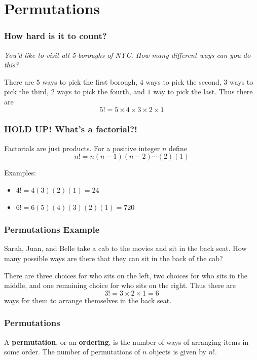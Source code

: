 \documentclass{beamer}
\newcommand{\<}{\langle}
\renewcommand{\>}{\rangle}
\begin{document}
\section{Permutations}


\begin{frame}
\frametitle{How hard is it to count?}

\emph{You'd like to visit all 5 boroughs of NYC. How many different ways can you do this?}
\newline

\pause

There are $5$ ways to pick the first borough, $4$ ways to pick the second, $3$ ways to pick the third, $2$ ways to pick the fourth, and $1$ way to pick the last. Thus there are
\[
5! = 5 \times 4 \times 3 \times 2 \times 1
\]

\end{frame}


\begin{frame}
\frametitle{HOLD UP! What's a factorial?!}

Factorials are just products. For a positive integer $n$ define
\[
n! = n(n-1)(n-2)\cdots(2)(1)
\]

Examples:
\begin{itemize}
\item $4! = 4(3)(2)(1) = 24$
\item $6! = 6(5)(4)(3)(2)(1) = 720$
\end{itemize}
\end{frame}


\begin{frame}
\frametitle{Permutations Example}

Sarah, Juan, and Belle take a cab to the movies and sit in the back seat. How many possible ways are there that they can sit in the back of the cab?\newline

\pause

There are three choices for who sits on the left, two choices for who sits in the middle, and one remaining choice for who sits on the right. Thus there are
\[
3! = 3\times 2 \times 1 = 6
\]
ways for them to arrange themselves in the back seat.
\end{frame}

\begin{frame}
\frametitle{Permutations}

A \textbf{permutation}, or an \textbf{ordering}, is the number of ways of arranging items in some order. {\color{red}The number of permutations of $n$ objects is given by $n!$.}
\end{frame}
\end{document}
